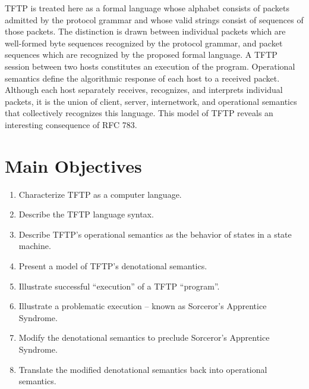 \documentclass[a0,landscape]{a0poster}
\begin{document}
\begin{multicols}{4}
TFTP is treated here as a formal language whose alphabet consists of packets admitted by the protocol grammar and whose valid strings consist of sequences of those packets. The distinction is drawn between individual packets which are well-formed byte sequences recognized by the protocol grammar, and packet sequences which are recognized by the proposed formal language. A TFTP session between two hosts constitutes an execution of the program. Operational semantics define the algorithmic response of each host to a received packet. Although each host separately receives, recognizes, and interprets individual packets, it is the union of client, server, internetwork, and operational semantics that collectively recognizes this language. This model of TFTP reveals an interesting consequence of RFC 783.


\color{DarkSlateGray} %

\section*{Main Objectives}

\begin{enumerate}
\item Characterize TFTP as a computer language.
\item Describe the TFTP language syntax.
\item Describe TFTP's operational semantics as the behavior of states in a state machine.
\item Present a model of TFTP's denotational semantics.
\item Illustrate successful ``execution'' of a TFTP ``program''.
\item Illustrate a problematic execution -- known as Sorceror's Apprentice Syndrome.
\item Modify the denotational semantics to preclude Sorceror's Apprentice Syndrome.
\item Translate the modified denotational semantics back into operational semantics.
\end{enumerate}



\end{multicols}
\end{document}
